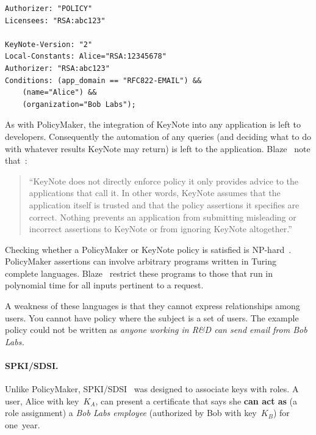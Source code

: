 \documentclass[thesis.tex]{subfiles}
\begin{document}
\noindent\begin{minipage}{\textwidth}
\begin{lstlisting}
Authorizer: "POLICY"
Licensees: "RSA:abc123"

KeyNote-Version: "2"
Local-Constants: Alice="RSA:12345678" 
Authorizer: "RSA:abc123"
Conditions: (app_domain == "RFC822-EMAIL") &&
    (name="Alice") &&
    (organization="Bob Labs");
\end{lstlisting}
\end{minipage}

As with PolicyMaker, the integration of KeyNote into any application is left to
developers.  Consequently the automation of any queries (and deciding what to do
with whatever results KeyNote may return) is left to the application.
Blaze~\etal{} note that~\cite{blaze_keynote_1999}:

\begin{quotation}``KeyNote does not directly enforce policy it only provides advice
to the applications that call it. In other words, KeyNote assumes that the
application itself is trusted and that the policy assertions it specifies are
correct. Nothing prevents an application from submitting misleading or incorrect
assertions to KeyNote or from ignoring KeyNote altogether.''
\end{quotation}

Checking whether a PolicyMaker or KeyNote policy is satisfied is
NP-hard~\cite{blaze_compliance_1998}. PolicyMaker assertions can involve
arbitrary programs written in Turing complete languages. Blaze~\etal{} restrict
these programs to those that run in polynomial time for all inputs pertinent to
a request.

A weakness of these languages is that they cannot express relationships among
users. You cannot have policy where the subject is a set of users. The example
policy could not be written as \emph{anyone working in R\&D can send email from
Bob Labs.}


\paragraph*{SPKI/SDSI.}
Unlike PolicyMaker, SPKI/SDSI~\cite{ellison_spki_1999} was
designed to associate keys with roles.  A user, Alice with key~$K_A$,
can present a certificate that says she \textbf{can act as} (a role assignment) a \emph{Bob Labs
employee} (authorized by Bob with key~$K_B$) for one~year.
\end{document}
